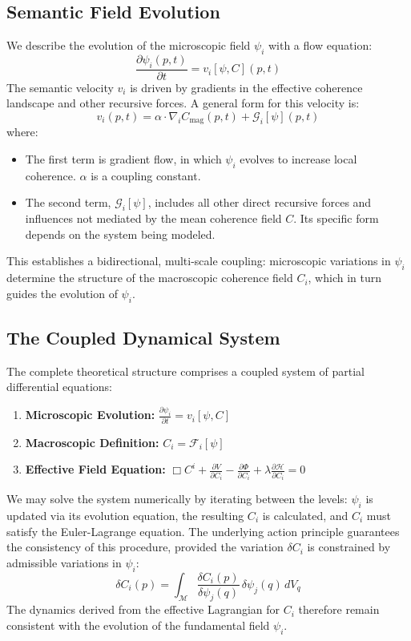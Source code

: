 \subsection{Semantic Field Evolution}

We describe the evolution of the microscopic field \(\psi_i\) with a flow equation:
\begin{equation}
\frac{\partial \psi_i(p, t)}{\partial t} = v_i[\psi, C](p, t)
\end{equation}
The semantic velocity \(v_i\) is driven by gradients in the effective coherence landscape and other recursive forces. A general form for this velocity is:
\begin{equation}
v_i(p, t) = \alpha \cdot \nabla_i C_{\mathrm{mag}}(p, t) + \mathcal{G}_i[\psi](p, t)
\end{equation}
where:
\begin{itemize}
    \item The first term is gradient flow, in which \(\psi_i\) evolves to increase local coherence. \(\alpha\) is a coupling constant.
    \item The second term, \(\mathcal{G}_i[\psi]\), includes all other direct recursive forces and influences not mediated by the mean coherence field \(C\). Its specific form depends on the system being modeled.
\end{itemize}
This establishes a bidirectional, multi-scale coupling: microscopic variations in \(\psi_i\) determine the structure of the macroscopic coherence field \(C_i\), which in turn guides the evolution of \(\psi_i\).

\subsection{The Coupled Dynamical System}

The complete theoretical structure comprises a coupled system of partial differential equations:
\begin{enumerate}
    \item \textbf{Microscopic Evolution:} \(\displaystyle \frac{\partial \psi_i}{\partial t} = v_i[\psi, C]\)
    \item \textbf{Macroscopic Definition:} \(C_i = \mathcal{F}_i[\psi]\)
    \item \textbf{Effective Field Equation:} \(\Box C^i + \frac{\partial V}{\partial C_i} - \frac{\partial \Phi}{\partial C_i} + \lambda \frac{\partial \mathcal{H}}{\partial C_i} = 0\)
\end{enumerate}
We may solve the system numerically by iterating between the levels: \(\psi_i\) is updated via its evolution equation, the resulting \(C_i\) is calculated, and \(C_i\) must satisfy the Euler-Lagrange equation. The underlying action principle guarantees the consistency of this procedure, provided the variation \(\delta C_i\) is constrained by admissible variations in \(\psi_i\):
\begin{equation}
\delta C_i(p) = \int_{\mathcal{M}} \frac{\delta C_i(p)}{\delta \psi_j(q)} \, \delta \psi_j(q) \, dV_q
\end{equation}
The dynamics derived from the effective Lagrangian for \(C_i\) therefore remain consistent with the evolution of the fundamental field \(\psi_i\).